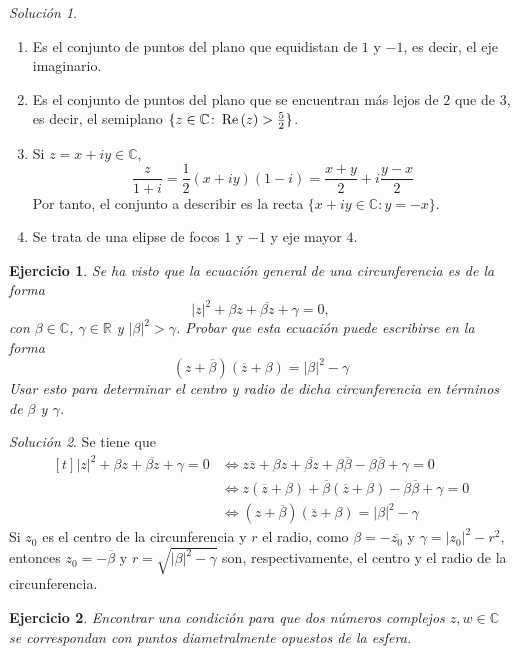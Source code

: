 \documentclass[11pt]{report}
\newcommand{\R}{\mathbb R}
\newcommand{\C}{\mathbb C}
\newcommand{\pars}[1]{\left( #1 \right)} %
\renewcommand{\Re}[1]{\,\textup{Re}\pars{#1}}
\newtheorem{exercise}{Ejercicio}
\theoremstyle{remark}
\newtheorem*{resolution}{Solución}
\begin{document}
\begin{resolution}
\hfill
    \begin{enumerate}
        \item Es el conjunto de puntos del plano que equidistan de $1$ y $-1$, es decir, el eje imaginario.
        \item Es el conjunto de puntos del plano que se encuentran más lejos de $2$ que de $3$, es decir, el semiplano $\{z \in \C \colon \Re{z} > \frac{5}{2}\}$.
        \item Si $z = x+iy \in \C$,
        \[\frac{z}{1+i} = \frac{1}{2}(x+iy)(1-i) = \frac{x+y}{2}+i\frac{y-x}{2}\]
        Por tanto, el conjunto a describir es la recta $\{x+iy \in \C \colon y = -x\}$.
        \item Se trata de una elipse de focos $1$ y $-1$ y eje mayor $4$.
    \end{enumerate}
\end{resolution}

\begin{exercise} 
    Se ha visto que la ecuación general de una circunferencia es de la forma \[|z|^2+\beta z+\overline{\beta z}+\gamma = 0,\] con $\beta \in \C$, $\gamma \in \R$ y $|\beta|^2>\gamma$. Probar que esta ecuación puede escribirse en la forma
    \[\pars{z+\overline{\beta}}\pars{\overline{z}+\beta} = |\beta|^2-\gamma\]
    Usar esto para determinar el centro y radio de dicha circunferencia en términos de $\beta$ y $\gamma$.
\end{exercise}

\begin{resolution}
    Se tiene que
    \[\begin{aligned}[t]
        |z|^2+\beta z+\overline{\beta z}+\gamma = 0 &\iff z\overline{z}+\beta z+\overline{\beta z}+\beta \overline{\beta}-\beta\overline{\beta}+\gamma = 0 \\
        &\iff z(\overline{z}+\beta)+\overline{\beta}(\overline{z}+\beta)-\beta \overline{\beta}+\gamma=0 \\
        &\iff (z+\overline{\beta})(\overline{z}+\beta) = |\beta|^2-\gamma
    \end{aligned}\]
    Si $z_0$ es el centro de la circunferencia y $r$ el radio, como $\beta = -\overline{z_0}$ y $\gamma=|z_0|^2-r^2$, entonces $z_0 = -\overline{\beta}$ y $r = \sqrt{|\beta|^2-\gamma}$ son, respectivamente, el centro y el radio de la circunferencia.
\end{resolution}

\begin{exercise}
    Encontrar una condición para que dos números complejos $z, w \in \C$ se correspondan con puntos diametralmente opuestos de la esfera.
\end{exercise}
\end{document}

